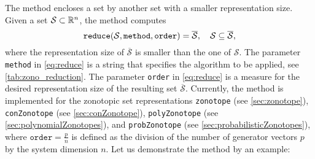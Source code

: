 \vspace{1cm}


The method  encloses a set by another set with a smaller representation size. Given a set $\mathcal{S} \subset \mathbb{R}^n$, the method  computes
\begin{equation}
	{\normalfont \texttt{reduce}}(\mathcal{S},\texttt{method},\texttt{order}) = \overline{\mathcal{S}}, ~~~ \mathcal{S} \subseteq \overline{\mathcal{S}},
	\label{eq:reduce}
\end{equation}
where the representation size of $\overline{\mathcal{S}}$ is smaller than the one of $\mathcal{S}$. The parameter \texttt{method} in \eqref{eq:reduce} is a string that specifies the algorithm to be applied, see \cref{tab:zono_reduction}. The parameter \texttt{order} in \eqref{eq:reduce} is a measure for the desired representation size of the resulting set $\overline{\mathcal{S}}$. Currently, the method  is implemented for the zonotopic set representations \texttt{zonotope} (see \cref{sec:zonotope}), \texttt{conZonotope} (see \cref{sec:conZonotope}), \texttt{polyZonotope} (see \cref{sec:polynomialZonotopes}), and \texttt{probZonotope} (see \cref{sec:probabilisticZonotopes}), where $\texttt{order} = \frac{p}{n}$ is defined as the division of the number of generator vectors $p$ by the system dimension $n$. Let us demonstrate the method  by an example:

\begin{center}
\begin{minipage}[t]{0.35\textwidth}
	\vspace{10pt}
	\footnotesize
	
\end{minipage}
\begin{minipage}[t]{0.6\textwidth}
	\vspace{0pt}
	\centering
\end{minipage}
\end{center}


